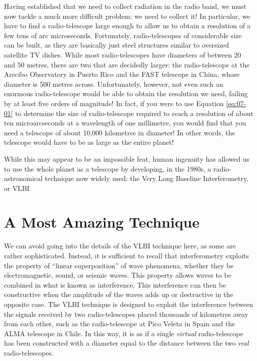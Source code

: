 Having established that we need to collect radiation in the radio band, we must now
tackle a much more difficult problem: we need to collect it! In particular, we have to
find a radio-telescope large enough to allow us to obtain a resolution of a few tens of
arc microseconds. Fortunately, radio-telescopes of considerable size can be built, as
they are basically just steel structures similar to oversized satellite TV dishes. While
most radio-telescopes have diameters of between 20 and 50 metres, there are two that are
decidedly larger: the radio-telescope at the Arecibo Observatory in
Puerto Rico and the FAST telescope in China, whose diameter is 500
metres across. Unfortunately, however, not even such an enormous radio-telescope would
be able to obtain the resolution we need, failing by at least five orders of magnitude!
In fact, if you were to use Equation \eqref{eq:07-01} to determine the size of radio-telescope
required to reach a resolution of about ten microarcseconds at a wavelength of one
millimetre, you would find that you need a telescope of about 10,000 kilometres in
diameter! In other words, the telescope would have to be as large as the entire planet!

While this may appear to be an impossible feat, human ingenuity has allowed us to use
the whole planet as a telescope by developing, in the 1980s, a radio-astronomical
technique now widely used: the Very Long Baseline Interferometry, or
VLBI.

\section{A Most Amazing Technique}\label{sec:07-vlbi}

We can avoid going into the details of the VLBI technique here, as some are rather
sophisticated. Instead, it is sufficient to recall that interferometry exploits the
property of ``linear superposition'' of wave phenomena, whether they be
electromagnetic, sound, or seismic
waves. This property allows waves to be combined in what is known as
interference. This interference can then be
constructive when the amplitude of the waves adds up or
destructive in the opposite case. The VLBI technique is designed to
exploit the interference between the signals received by two radio-telescopes placed
thousands of kilometres away from each other, such as the
radio-telescope at Pico Veleta in Spain and the ALMA
telescope in Chile. In this way, it is as if a single \emph{virtual}
radio-telescope has been constructed with a diameter equal to the distance between the
two \emph{real} radio-telescopes.

